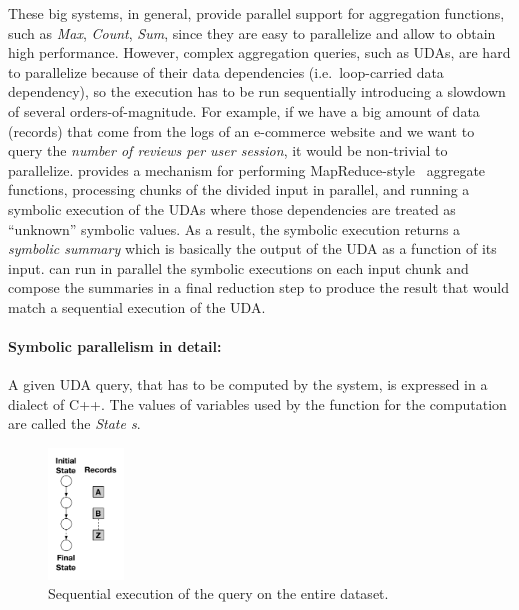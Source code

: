 \begin{refsection}
\noindent
These big systems, in general, provide parallel support for aggregation
functions, such as \emph{Max}, \emph{Count}, \emph{Sum}, since they are easy
to parallelize and allow to obtain high performance.
%
However, complex aggregation queries, such as UDAs, are hard to parallelize
because of their data dependencies (i.e.\ loop-carried data dependency), so
the execution has to be run sequentially introducing a slowdown of several
orders-of-magnitude.
%
For example, if we have a big amount of data (records) that come from the logs
of an e-commerce website and we want to query the \emph{number of reviews per
  user session}, it would be non-trivial to parallelize.
%
\symp provides a mechanism for performing
MapReduce-style~\cite{Dean:2008:MSD:1327452.1327492} aggregate functions,
processing chunks of the divided input in parallel, and running a symbolic
execution of the UDAs where those dependencies are treated as ``unknown''
symbolic values.
%
As a result, the symbolic execution returns a \emph{symbolic summary} which is
basically the output of the UDA as a function of its input.
%
\symp can run in parallel the symbolic executions on each input chunk and
compose the summaries in a final reduction step to produce the result that
would match a sequential execution of the UDA.
\\

\noindent
\paragraph{Symbolic parallelism in detail:}

A given UDA query, that has to be computed by the system, is expressed in a
dialect of C++.
%
The values of variables used by the function for the computation are called
the \emph{State s}.

\begin{figure}
  \centering
  \vspace{-15pt}
  \includegraphics[width=0.18\textwidth]{figures/symple_ex2}
  \vspace{-10pt}
  \caption{Sequential execution of the query on the entire dataset.}
  \label{fig:symple_ex2}
\end{figure}


\end{refsection}
